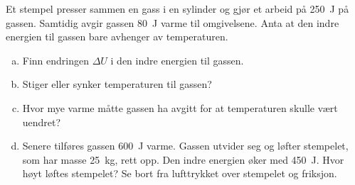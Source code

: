 %
Et stempel presser sammen en gass i en sylinder og gjør et arbeid på \SI{250}{\joule} på gassen. Samtidig avgir gassen \SI{80}{\joule} varme til omgivelsene. Anta at den indre energien til gassen bare avhenger av temperaturen.
\begin{enumerate}[a)]
    \item Finn endringen $\Delta U$ i den indre energien til gassen.
    \item Stiger eller synker temperaturen til gassen?
    \item Hvor mye varme måtte gassen ha avgitt for at temperaturen skulle vært uendret?
    \item Senere tilføres gassen \SI{600}{\joule} varme. Gassen utvider seg og løfter stempelet, som har masse \SI{25}{\kilo\gram}, rett opp. Den indre energien øker med \SI{450}{\joule}. Hvor høyt løftes stempelet? Se bort fra lufttrykket over stempelet og friksjon.
\end{enumerate}
%
